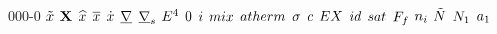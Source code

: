 \begin{mitframe}{000-0}
$\exvecthree$ \newline
$\matrx$ \newline
$\intscal$ \newline
$\partmol$ \newline
$\tderiv$ \newline
$\gradop$ \newline
$\surfgradop$ \newline
$\axbiop$ \newline
$\init$ \newline
$\state$ \newline
$\mixfunc$ \newline
$\atfunc$ \newline
$\bound$ \newline
$\crit$ \newline
$\exfunc$ \newline
$\idgas$ \newline
$\satvap$ \newline
$\fricforce$ \newline
$\molspecies{i}$ \newline
$\totmoles$ \newline
$\molesi{1}$ \newline
$\activityi{1}$ \newline

\end{mitframe}
